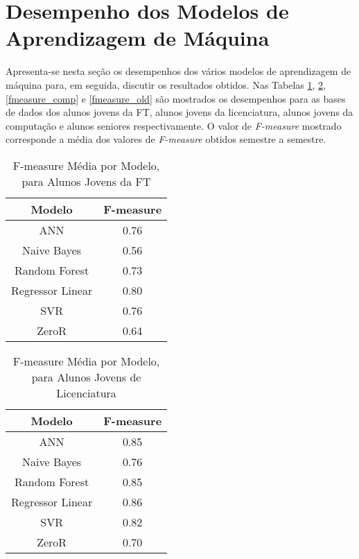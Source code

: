 \section{Desempenho dos Modelos de Aprendizagem de Máquina} \label{results_ml_models}
Apresenta-se nesta seção os desempenhos dos vários modelos de aprendizagem de
máquina para, em seguida, discutir os resultados obtidos. Nas Tabelas
\ref{fmeasure_ft}, \ref{fmeasure_lic}, \ref{fmeasure_comp} e \ref{fmeasure_old} são 
mostrados os desempenhos para as bases de dados dos alunos jovens da FT, alunos
jovens da licenciatura, alunos jovens da computação e alunos seniores
respectivamente. O valor de \textit{F-measure} mostrado corresponde a média dos valores de
\textit{F-measure} obtidos semestre a semestre.  

\begin{table}
\begin{center}
\begin{tabular}[c]{| c | c |}
    \hline
    \textbf{Modelo} & \textbf{F-measure} \\
    \hline
    ANN              & 0.76 \\
    \hline
    Naive Bayes      & 0.56 \\
    \hline
    Random Forest    & 0.73 \\
    \hline
    Regressor Linear & 0.80 \\
    \hline
    SVR              & 0.76 \\
    \hline
    ZeroR            & 0.64 \\
    \hline
\end{tabular}
\end{center}
\caption{F-measure Média por Modelo, para Alunos Jovens da FT}
\label{fmeasure_ft}
\end{table}

\begin{table}
\begin{center}
\begin{tabular}[c]{| c | c |}
    \hline
    \textbf{Modelo} & \textbf{F-measure} \\
    \hline
    ANN              & 0.85 \\
    \hline
    Naive Bayes      & 0.76 \\
    \hline
    Random Forest    & 0.85 \\
    \hline
    Regressor Linear & 0.86 \\
    \hline
    SVR              & 0.82 \\
    \hline
    ZeroR            & 0.70 \\
    \hline
\end{tabular}
\end{center}
\caption{F-measure Média por Modelo, para Alunos Jovens de Licenciatura}
\label{fmeasure_lic}
\end{table}

